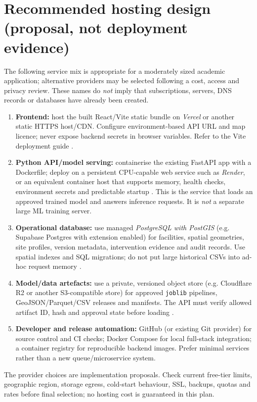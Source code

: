 \documentclass[11pt,a4paper,openany]{report}
\newcommand{\pathcode}[1]{\nolinkurl{#1}}
\begin{document}
\section{Recommended hosting design (proposal, not deployment evidence)}
The following service mix is appropriate for a moderately sized academic application; alternative providers may be selected following a cost, access and privacy review. These names do \emph{not} imply that subscriptions, servers, DNS records or databases have already been created.
\begin{enumerate}
\item \textbf{Frontend:} host the built React/Vite static bundle on \emph{Vercel} or another static HTTPS host/CDN. Configure environment-based API URL and map licence; never expose backend secrets in browser variables. Refer to the Vite deployment guide \cite{Vite}.
\item \textbf{Python API/model serving:} containerise the existing FastAPI app with a Dockerfile; deploy on a persistent CPU-capable web service such as \emph{Render}, or an equivalent container host that supports memory, health checks, environment secrets and predictable startup \cite{Render}. This is the service that loads an approved trained model and answers inference requests. It is \emph{not} a separate large ML training server.
\item \textbf{Operational database:} use managed \emph{PostgreSQL with PostGIS} (e.g. Supabase Postgres with extension enabled) for facilities, spatial geometries, site profiles, version metadata, intervention evidence and audit records. Use spatial indexes and SQL migrations; do not put large historical CSVs into ad-hoc request memory \cite{Supabase}.
\item \textbf{Model/data artefacts:} use a private, versioned object store (e.g. Cloudflare R2 or another S3-compatible store) for approved \pathcode{joblib} pipelines, GeoJSON/Parquet/CSV releases and manifests. The API must verify allowed artifact ID, hash and approval state before loading \cite{R2}.
\item \textbf{Developer and release automation:} GitHub (or existing Git provider) for source control and CI checks; Docker Compose for local full-stack integration; a container registry for reproducible backend images. Prefer minimal services rather than a new queue/microservice system.
\end{enumerate}
The provider choices are implementation proposals. Check current free-tier limits, geographic region, storage egress, cold-start behaviour, SSL, backups, quotas and rates before final selection; no hosting cost is guaranteed in this plan.
\end{document}
